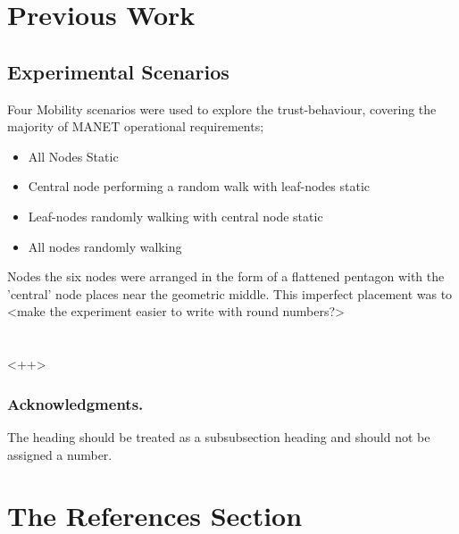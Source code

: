\documentclass[runningheads,a4paper]{llncs}
\begin{document}
\section{Previous Work}

\subsection{Experimental Scenarios}

Four Mobility scenarios were used to explore the trust-behaviour, covering the majority of MANET operational requirements; 

\begin{itemize}
  \item All Nodes Static
  \item Central node performing a random walk with leaf-nodes static
  \item Leaf-nodes randomly walking with central node static
  \item All nodes randomly walking
\end{itemize}

Nodes the six nodes were arranged in the form of a flattened pentagon with the 'central' node places near the geometric middle. This imperfect placement was to <make the experiment easier to write with round numbers?>

\section{}<++>

\subsubsection*{Acknowledgments.} The heading should be treated as a
subsubsection heading and should not be assigned a number.

\section{The References Section}\label{references}
\end{document}
